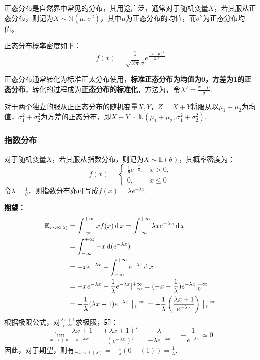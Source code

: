 \documentclass[12pt,a4paper]{article}
\begin{document}
  正态分布是自然界中常见的分布，其用途广泛，通常对于随机变量$X$，若其服从正态分布，则记为$X\sim \mathbb{N}(\mu, \sigma^2)$，其中$\mu$为正态分布的均值，而$\sigma^2$为正态分布均值。

  正态分布概率密度如下：
  $$
  f(x) = \frac{1}{\sqrt{2\pi}\sigma}e^{\frac{(x-\mu)^2}{2\sigma^2}}
  $$

  正态分布通常转化为标准正太分布使用，\textbf{标准正态分布为均值为0，方差为1的正态分布}，转化的过程成为\textbf{正态分布的标准化}，方法为，令$X' = \frac{x-\mu}{\sigma}$. 

  对于两个独立的服从正正态分布的随机变量$X,Y$，$Z=X+Y$将服从以$\mu_1 + \mu _2$为均值，$\sigma _1 ^2  + \sigma _2 ^2$为方差的正态分布，即$X+Y \sim \mathbb{N}(\mu _1 + \mu _2, \sigma _1 ^2 + \sigma _2 ^2)$.

  \subsubsection{指数分布}
  对于随机变量$X$，若其服从指数分布，则记为$X\sim \mathbb{E}(\theta)$，其概率密度为：
  $$
  f(x) = \left\{
    \begin{array}{cl}
      \frac{1}{\theta} e^{-\frac{x}{\theta}}, & x > 0, \\ 
      0, & x \leq 0
    \end{array}
  \right.
  $$
  令$\lambda = \frac{1}{\theta}$，则指数分布亦可写成$f(x) = \lambda e^{-\lambda x}$. 

  \textbf{期望：}
  $$
  \begin{aligned}
    \mathbb{E}_{x\sim \mathbb{E}(\lambda)} &= \int_{-\infty}^{+\infty} x f(x) \operatorname{d}x = \int_{-\infty}^{+\infty} \lambda x e ^{-\lambda x} \operatorname{d}x \\ 
    &= \int_{-\infty}^{+\infty} -x \operatorname{d} (e^{-\lambda x}) \\
    &= -x e^{-\lambda x} + \int_{-\infty}^{+\infty} e^{-\lambda x}\operatorname{d} x \\ 
    &= -x e^{-\lambda x} -\frac{1}{\lambda}e^{-\lambda x}\arrowvert _{-\infty}^{+\infty} = (-x-\frac{1}{\lambda})e^{-\lambda x}\arrowvert _{0}^{+\infty}\\ 
    &= -\frac{1}{\lambda}(\lambda x + 1)e^{-\lambda x} \left\arrowvert _{0}^{+\infty}\right. = -\frac{1}{\lambda}\left(\frac{\lambda x + 1}{e^{-\lambda x}}\right) \left\arrowvert _{0}^{+\infty}\right.
  \end{aligned}
  $$
  根据极限公式，对$\frac{\lambda x + 1}{e^{-\lambda x}}$求极限，即：
  $$
  \lim\limits _{x\rightarrow + \infty} \frac{\lambda x + 1}{e^{-\lambda x}} = \frac{(\lambda x + 1)'}{\left(e^{-\lambda x}\right)'} = \frac{\lambda}{-\lambda e^{-\lambda x}} = -\frac{1}{e^{-\lambda x}} \simeq 0
  $$
  因此，对于期望，则有$\mathbb{E}_{x\sim \mathbb{E}(\lambda)}=-\frac{1}{\lambda}(0-(1))=\frac{1}{\lambda}$.
\end{document}
